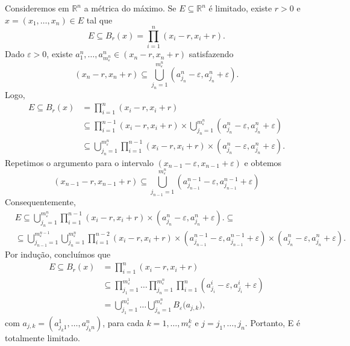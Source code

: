 \documentclass[metric_notes.tex]{subfiles}
\begin{document}
\begin{proof*}
	Consideremos em \(\mathbb{R}^{n}\) a métrica do máximo. Se \(E\subseteq{\mathbb{R}^{n}}\) é limitado, existe \(r > 0\) e \(x = (x_{1}, \dotsc, x_{n})\in E\) tal que
	\[
		E\subseteq{B_{r}(x)} = \prod\limits_{i=1}^{n}(x_{i}-r, x_{i}+r).
	\]
	Dado \(\varepsilon >0\), existe \(a_{1}^{n}, \dotsc, a_{m_{\varepsilon }^{n}}^{n}\in(x_{n}-r, x_{n}+r)\) satisfazendo
	\[
		(x_{n}-r,x_{n}+r) \subseteq{\bigcup_{j_{n}=1}^{m_{\varepsilon }^{n}}{(a_{j_{n}}^{n}-\varepsilon , a_{j_{n}}^{n}+\varepsilon )}}.
	\]
	Logo,
	\begin{align*}
		E \subseteq{B_{r}(x)} & =\prod\limits_{i=1}^{n}(x_{i}-r, x_{i}+r)                                                                                                                      \\
		                      & \subseteq{}\prod\limits_{i=1}^{n-1}(x_{i}-r, x_{i}+r)\times \bigcup_{j_{n}=1}^{m_{\varepsilon }^{n}}{(a_{j_{n}}^{n}-\varepsilon , a_{j_{n}}^{n}+\varepsilon )} \\
		                      & \subseteq{\bigcup_{j_{n}=1}^{m_{\varepsilon }^{n}}\prod\limits_{i=1}^{n-1}(x_{i}-r, x_{i}+r)\times (a_{j_{n}}^{n}-\varepsilon , a_{j_{n}}^{n}+\varepsilon ).}
	\end{align*}
	Repetimos o argumento para o intervalo \((x_{n-1}-\varepsilon , x_{n-1}+\varepsilon )\) e obtemos
	\[
		(x_{n-1}-r, x_{n-1}+r)\subseteq{\bigcup_{j_{n-1}=1}^{m_{\varepsilon }^{n}}{(a_{j_{n-1}}^{n-1}-\varepsilon, a_{j_{n-1}}^{n-1}+\varepsilon  )}}
	\]
	Consequentemente,
	\begin{align*}
		 & E\subseteq{\bigcup_{j_{n}=1}^{m_{\varepsilon }^{n}}\prod\limits_{i=1}^{n-1}(x_{i}-r, x_{i}+r)\times (a_{j_{n}}^{n}-\varepsilon , a_{j_{n}}^{n}+\varepsilon ).}\subseteq{}                                                                                                       \\
		 & \subseteq{\bigcup_{j_{n-1}=1}^{m_{\varepsilon }^{n-1}}\bigcup_{j_{n}=1}^{m_{\varepsilon }^{n}}\prod\limits_{i=1}^{n-2}(x_{i}-r, x_{i}+r)\times(a_{j_{n-1}}^{n-1}-\varepsilon , a_{j_{n-1}}^{n-1}+\varepsilon )\times (a_{j_{n}}^{n}-\varepsilon , a_{j_{n}}^{n}+\varepsilon ).}
	\end{align*}
	Por indução, concluímos que
	\begin{align*}
		E \subseteq{B_{r}(x)} & =\prod\limits_{i=1}^{n}(x_{i}-r, x_{i}+r)                                                                                                                                                  \\
		                      & \subseteq{}\prod\limits_{j_{1}=1}^{m_{\varepsilon }^{1}}\dotsc \prod\limits_{j_{n}=1}^{m_{\varepsilon }^{n}}\prod\limits_{i=1}^{n}(a_{j_{i}}^{i}-\varepsilon , a_{j_{i}}^{i}+\varepsilon ) \\
		                      & =\bigcup_{j_{1}=1}^{m_{\varepsilon }^{1}}{\dotsc}\bigcup_{j_{n}=1}^{m_{\varepsilon }^{n}}{B_{\varepsilon }(a_{j, k}}),
	\end{align*}
	com \(a_{j, k} = (a_{j_{k}1}^{1},\dotsc,a_{j_{k}n}^{n})\), para cada \(k=1, \dotsc, m_{\varepsilon }^{k}\) e \(j=j_{1},\dotsc,j_{n}\). Portanto, E é totalmente limitado. \qedsymbol
\end{proof*}
\end{document}
